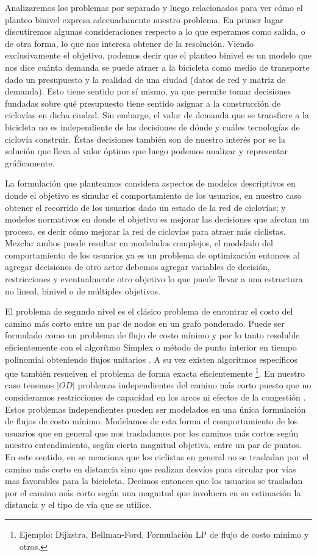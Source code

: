 \documentclass{article}
\begin{document}
  Analizaremos los problemas por separado y luego relacionados para ver cómo el planteo binivel expresa adecuadamente nuestro problema. En primer lugar discutiremos algunas consideraciones respecto a lo que esperamos como salida, o de otra forma, lo que nos interesa obtener de la resolución. Viendo exclusivamente el objetivo, podemos decir que el planteo binivel es un modelo que nos dice cuánta demanda se puede atraer a la bicicleta como medio de transporte dado un presupuesto y la realidad de una ciudad (datos de red y matriz de demanda). Esto tiene sentido por sí mismo, ya que permite tomar decisiones fundadas sobre qué presupuesto tiene sentido asignar a la construcción de ciclovías en dicha ciudad. Sin embargo, el valor de demanda que se transfiere a la bicicleta no es independiente de las decisiones de dónde y cuáles tecnologías de ciclovía construir. Éstas decisiones también son de nuestro interés por se la solución que lleva al valor óptimo que luego podemos analizar y representar gráficamente.

  La formulación que planteamos considera aspectos de modelos descriptivos en donde el objetivo es simular el comportamiento de los usuarios, en nuestro caso obtener el recorrido de los usuarios dado un estado de la red de ciclovías; y modelos normativos en donde el objetivo es mejorar las decisiones que afectan un proceso, es decir cómo mejorar la red de ciclovías para atraer más ciclistas. Mezclar ambos puede resultar en modelados complejos, el modelado del comportamiento de los usuarios ya es un problema de optimización entonces al agregar decisiones de otro actor debemos agregar variables de decisión, restricciones y eventualmente otro objetivo lo que puede llevar a una estructura no lineal, binivel o de múltiples objetivos.

  El problema de segundo nivel es el clásico problema de encontrar el costo del camino más corto entre un par de nodos en un grafo ponderado. Puede ser formulado como un problema de flujo de costo mínimo y por lo tanto resoluble eficientemente con el algorítmo Simplex o método de punto interior en tiempo polinomial obteniendo flujos unitarios \cite{networkflowsbook}. A su vez existen algoritmos específicos que también resuelven el problema de forma exacta eficientemente \footnote{Ejemplo: Dijkstra, Bellman-Ford, Formulación LP de flujo de costo mínimo y otros.}. En nuestro caso tenemos $|OD|$ problemas independientes del camino más corto puesto que no consideramos restricciones de capacidad en los arcos ni efectos de la congestión \cite{Sheffi1985}. Estos problemas independientes pueden ser modelados en una única formulación de flujos de costo mínimo. Modelamos de esta forma el comportamiento de los usuarios que en general que nos trasladamos por los caminos más cortos según nuestro entendimiento, según cierta magnitud objetiva, entre un par de puntos. En este sentido, en \cite{winters2010} se menciona que los ciclistas en general no se trasladan por el camino más corto en distancia sino que realizan desvíos para circular por vías mas favorables para la bicicleta. Decimos entonces que los usuarios se trasladan por el camino más corto según una magnitud que involucra en su estimación la distancia y el tipo de vía que se utilice.
\end{document}
